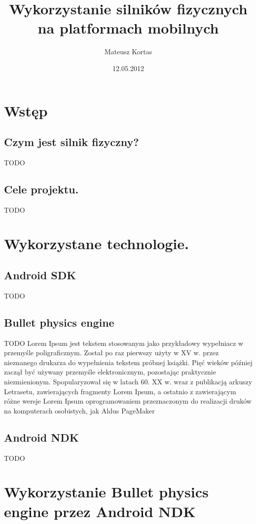 \documentclass[12pt]{article}
\title{Wykorzystanie silników fizycznych na platformach mobilnych}
\author{Mateusz Kortas}
\date{12.05.2012}
\begin{document}
\marginsize{2.5cm}{2cm}{1cm}{1cm}
  \maketitle
  \tableofcontents
  \section{Wstęp}\label{sec:wstep}
  \subsection{Czym jest silnik fizyczny?}\label{subsec:czymJestSilnik}
TODO
  \subsection{Cele projektu.}\label{subsec:celeProjektu}
TODO
  \section{Wykorzystane technologie.}
  \subsection{Android SDK}
TODO
  \subsection{Bullet physics engine}
TODO
Lorem Ipsum jest tekstem stosowanym jako przykładowy wypełniacz w przemyśle
poligraficznym. Został po raz pierwszy użyty w XV w. przez nieznanego drukarza do wypełnienia tekstem próbnej książki. Pięć wieków później zaczął być używany przemyśle elektronicznym, pozostając praktycznie niezmienionym. Spopularyzował się w latach 60. XX w. wraz z publikacją arkuszy Letrasetu, zawierających fragmenty Lorem Ipsum, a ostatnio z zawierającym różne wersje Lorem Ipsum oprogramowaniem przeznaczonym do realizacji druków na komputerach osobistych, jak Aldus PageMaker
  \subsection{Android NDK}
TODO
  \section{Wykorzystanie Bullet physics engine przez Android NDK}
\end{document}
